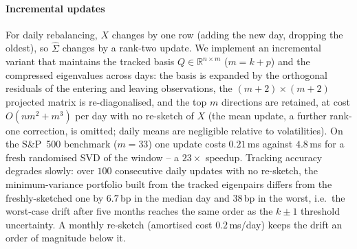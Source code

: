 \paragraph{Incremental updates}
For daily rebalancing, $X$ changes by one row (adding the new day, dropping the
oldest), so $\hat\Sigma$ changes by a rank-two update. We implement an
incremental variant that maintains the tracked basis $Q \in \mathbb{R}^{n
\times m}$ ($m = k + p$) and the compressed eigenvalues across days: the basis
is expanded by the orthogonal residuals of the entering and leaving
observations, the $(m{+}2) \times (m{+}2)$ projected matrix is
re-diagonalised, and the top $m$ directions are retained, at cost
$O(nm^2 + m^3)$ per day with no re-sketch of $X$ (the mean update, a further
rank-one correction, is omitted; daily means are negligible relative to
volatilities). On the S\&P~500 benchmark ($m = 33$) one update costs
$0.21$\,ms against $4.8$\,ms for a fresh randomised SVD of the window -- a
$23\times$ speedup. Tracking accuracy degrades slowly: over $100$ consecutive
daily updates with no re-sketch, the minimum-variance portfolio built from the
tracked eigenpairs differs from the freshly-sketched one by $6.7$\,bp in the
median day and $38$\,bp in the worst, i.e.\ the worst-case drift after five
months reaches the same order as the $k \pm 1$ threshold uncertainty. A
monthly re-sketch (amortised cost $0.2$\,ms/day) keeps the drift an order of
magnitude below it.
